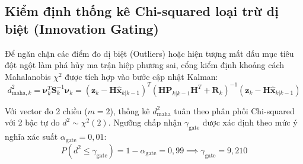\begin{table}[H]
\centering
\caption{Các tham số khí động học và giới hạn góc nghiêng của DJI Matrice 100}
\label{tab:matrice100-aerodynamic-parameters}
\end{table}

\subsection{Kiểm định thống kê Chi-squared loại trừ dị biệt (Innovation Gating)}

\hspace{0.5cm} Để ngăn chặn các điểm đo dị biệt (Outliers) hoặc hiện tượng mất dấu mục tiêu đột ngột làm phá hủy ma trận hiệp phương sai, cổng kiểm định khoảng cách Mahalanobis $\chi^2$ được tích hợp vào bước cập nhật Kalman:
\begin{equation}
d_{\text{maha}, k}^2 = \boldsymbol{\nu}_k^T \mathbf{S}_k^{-1} \boldsymbol{\nu}_k = (\mathbf{z}_k - \mathbf{H}\hat{\mathbf{x}}_{k|k-1})^T (\mathbf{H}\mathbf{P}_{k|k-1}\mathbf{H}^T + \mathbf{R}_k)^{-1} (\mathbf{z}_k - \mathbf{H}\hat{\mathbf{x}}_{k|k-1})
\label{eq:mahalanobis-gating-statistic}
\end{equation}

Với vector đo 2 chiều ($m=2$), thống kê $d_{\text{maha}}^2$ tuân theo phân phối Chi-squared với 2 bậc tự do $d^2 \sim \chi^2(2)$. Ngưỡng chấp nhận $\gamma_{\text{gate}}$ được xác định theo mức ý nghĩa xác suất $\alpha_{\text{gate}} = 0{,}01$:
\begin{equation}
P(d^2 \le \gamma_{\text{gate}}) = 1 - \alpha_{\text{gate}} = 0{,}99 \implies \gamma_{\text{gate}} = 9{,}210
\label{eq:chi-squared-threshold-selection}
\end{equation}

